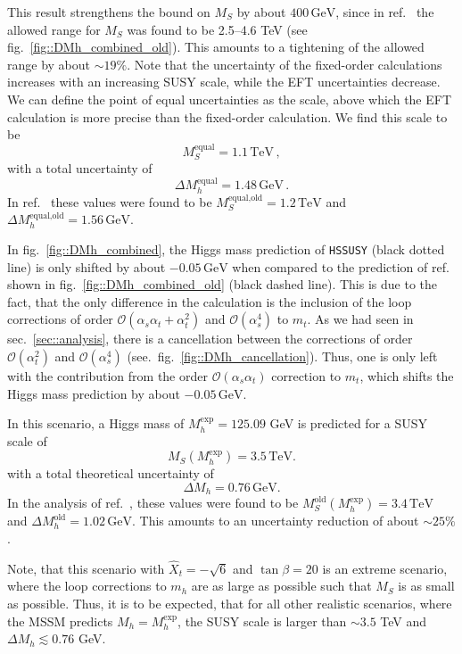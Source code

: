 \documentclass[a4paper,12pt]{book}
\begin{document}
This result strengthens the bound on $M_S$ by about $400\,\mathrm{GeV}$, since in ref.\ \cite{allanachvoigt} the allowed range for $M_S$ was found to be 2.5--4.6 TeV (see fig.\ \ref{fig::DMh_combined_old}). This amounts to a tightening of the allowed range by about $\sim 19\%$. Note that the uncertainty of the fixed-order calculations increases with an increasing SUSY scale, while the EFT uncertainties decrease. We can define the point of equal uncertainties as the scale, above which the EFT calculation is more precise than the fixed-order calculation. We find this scale to be
\begin{equation}
M_S^\text{equal}=1.1\,\mathrm{TeV}\,,
\end{equation} 
with a total uncertainty of 
\begin{equation}
\Delta M_h^\text{equal} = 1.48\,\mathrm{GeV}\,.
\end{equation}
In ref.\ \cite{allanachvoigt} these values were found to be $M_S^\text{equal,old}=1.2\,\mathrm{TeV}$ and $\Delta M_h^\text{equal,old} = 1.56\,\mathrm{GeV}$.\par
In fig.\ \ref{fig::DMh_combined}, the Higgs mass prediction of \texttt{HSSUSY} (black dotted line) is only shifted by about $-0.05\,\mathrm{GeV}$ when compared to the prediction of ref.\ \cite{allanachvoigt} shown in fig.\ \ref{fig::DMh_combined_old} (black dashed line). This is due to the fact, that the only difference in the calculation is the inclusion of the loop corrections of order $\mathcal{O}(\alpha_s\alpha_t+\alpha_t^2)$ and $\mathcal{O}(\alpha_s^4)$ to $m_t$. As we had seen in sec.\ \ref{sec::analysis}, there is a cancellation between the corrections of order $\mathcal{O}(\alpha_t^2)$ and $\mathcal{O}(\alpha_s^4)$ (see.\ fig.\ \ref{fig::DMh_cancellation}). Thus, one is only left with the contribution from the order $\mathcal{O}(\alpha_s\alpha_t)$ correction to $m_t$, which shifts the Higgs mass prediction by about $-0.05\,\mathrm{GeV}$.\par 
In this scenario, a Higgs mass of $M^\text{exp}_h=125.09$ GeV is predicted for a SUSY scale of
\begin{equation}
M_S(M^\text{exp}_h) = 3.5\, \mathrm{TeV}.
\end{equation} 
with a total theoretical uncertainty of
\begin{equation}
\Delta M_h = 0.76\, \mathrm{GeV}.
\end{equation}
In the analysis of ref.\ \cite{allanachvoigt}, these values were found to be $M_S^\text{old}(M^\text{exp}_h)= 3.4\, \mathrm{TeV}$ and $\Delta M_h^\text{old} = 1.02\, \mathrm{GeV}$. This amounts to an uncertainty reduction of about $\sim 25\%$.\par
Note, that this scenario with $\hat{X}_t = -\sqrt{6}$ and $\tan\beta = 20$ is an extreme scenario, where the loop corrections to $m_h$ are as large as possible such that $M_S$ is as small as possible. Thus, it is to be expected, that for all other realistic scenarios, where the MSSM predicts $M_h = M_h^\text{exp}$, the SUSY scale is larger than $\sim 3.5$ TeV and $\Delta M_h \lesssim 0.76$  GeV.
\end{document}
